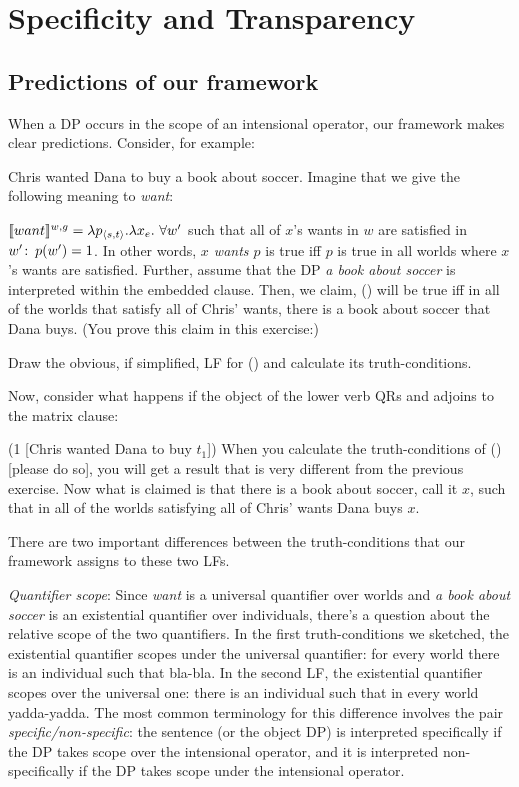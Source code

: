 \chapter{Specificity and Transparency}


\minitoc

\section{Predictions of our framework}
\label{sec:predictions}

When a DP occurs in the scope of an intensional operator, our framework makes
clear predictions. Consider, for example:

\ex
Chris wanted Dana to buy a book about soccer.
\xe
%
Imagine that we give the following meaning to \emph{want}:

\ex
$\llbracket want \rrbracket^{w,g} = \lambda p_{\langle s,t \rangle}.\lambda x_e.\ \forall w'$ such that
all of $x$'s wants in $w$ are satisfied in $w'\colon\thinspace p(w')=1$. 
\xe
%
In other words, \emph{$x$ wants $p$} is true iff $p$ is true in all worlds where
$x$'s wants are satisfied. Further, assume that the DP \emph{a book about
  soccer} is interpreted within the embedded clause. Then, we claim, (\blastx)
will be true iff in all of the worlds that satisfy all of Chris' wants, there is
a book about soccer that Dana buys. (You prove this claim in this exercise:)

\begin{exercise}
  Draw the obvious, if simplified, LF for (\blastx) and calculate its
  truth-conditions. \eex
\end{exercise}
%
Now, consider what happens if the object of the lower verb QRs and adjoins to
the matrix clause:

 (1 [Chris wanted Dana to buy $t_1$])
\xe
%
When you calculate the truth-conditions of (\lastx) [please do so], you will get
a result that is very different from the previous exercise. Now what is claimed
is that there is a book about soccer, call it $x$, such that in all of the
worlds satisfying all of Chris' wants Dana buys $x$.

There are two important differences between the truth-conditions that our framework
assigns to these two LFs.

\emph{Quantifier scope}: Since \emph{want} is a universal quantifier over
worlds and \emph{a book about soccer} is an existential quantifier over
individuals, there's a question about the relative scope of the two quantifiers.
In the first truth-conditions we sketched, the existential quantifier scopes
under the universal quantifier: for every world there is an individual such that
bla-bla. In the second LF, the existential quantifier scopes over the universal
one: there is an individual such that in every world yadda-yadda. The most
common terminology for this difference involves the pair
\emph{specific/non-specific}: the sentence (or the object DP) is interpreted
specifically if the DP takes scope over the intensional operator, and it is
interpreted non-specifically if the DP takes scope under the intensional operator.

